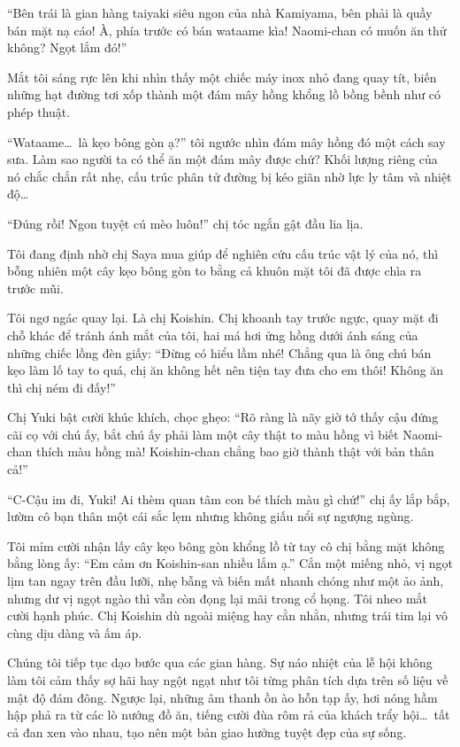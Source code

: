 \documentclass[../main.tex]{subfiles}
\begin{document}
``Bên trái là gian hàng taiyaki siêu ngon của nhà Kamiyama, bên phải là quầy bán mặt nạ cáo! À, phía trước có bán wataame kìa! Naomi-chan có muốn ăn thử không? Ngọt lắm đó!''

Mắt tôi sáng rực lên khi nhìn thấy một chiếc máy inox nhỏ đang quay tít, biến những hạt đường tơi xốp thành một đám mây hồng khổng lồ bồng bềnh như có phép thuật.

``Wataame\dots\ là kẹo bông gòn ạ?'' tôi ngước nhìn đám mây hồng đó một cách say sưa. Làm sao người ta có thể ăn một đám mây được chứ? Khối lượng riêng của nó chắc chắn rất nhẹ, cấu trúc phân tử đường bị kéo giãn nhờ lực ly tâm và nhiệt độ\dots

``Đúng rồi! Ngon tuyệt cú mèo luôn!'' chị tóc ngắn gật đầu lia lịa.

Tôi đang định nhờ chị Saya mua giúp để nghiên cứu cấu trúc vật lý của nó, thì bỗng nhiên một cây kẹo bông gòn to bằng cả khuôn mặt tôi đã được chìa ra trước mũi.

Tôi ngơ ngác quay lại. Là chị Koishin. Chị khoanh tay trước ngực, quay mặt đi chỗ khác để tránh ánh mắt của tôi, hai má hơi ửng hồng dưới ánh sáng của những chiếc lồng đèn giấy: ``Đừng có hiểu lầm nhé! Chẳng qua là ông chú bán kẹo làm lố tay to quá, chị ăn không hết nên tiện tay đưa cho em thôi! Không ăn thì chị ném đi đấy!''

Chị Yuki bật cười khúc khích, chọc ghẹo: ``Rõ ràng là nãy giờ tớ thấy cậu đứng cãi cọ với chú ấy, bắt chú ấy phải làm một cây thật to màu hồng vì biết Naomi-chan thích màu hồng mà! Koishin-chan chẳng bao giờ thành thật với bản thân cả!''

``C-Cậu im đi, Yuki! Ai thèm quan tâm con bé thích màu gì chứ!'' chị ấy lắp bắp, lườm cô bạn thân một cái sắc lẹm nhưng không giấu nổi sự ngượng ngùng.

Tôi mỉm cười nhận lấy cây kẹo bông gòn khổng lồ từ tay cô chị bằng mặt không bằng lòng ấy: ``Em cảm ơn Koishin-san nhiều lắm ạ.'' Cắn một miếng nhỏ, vị ngọt lịm tan ngay trên đầu lưỡi, nhẹ bẫng và biến mất nhanh chóng như một ảo ảnh, nhưng dư vị ngọt ngào thì vẫn còn đọng lại mãi trong cổ họng. Tôi nheo mắt cười hạnh phúc. Chị Koishin dù ngoài miệng hay cằn nhằn, nhưng trái tim lại vô cùng dịu dàng và ấm áp.

Chúng tôi tiếp tục dạo bước qua các gian hàng. Sự náo nhiệt của lễ hội không làm tôi cảm thấy sợ hãi hay ngột ngạt như tôi từng phân tích dựa trên số liệu về mật độ đám đông. Ngược lại, những âm thanh ồn ào hỗn tạp ấy, hơi nóng hầm hập phả ra từ các lò nướng đồ ăn, tiếng cười đùa rôm rả của khách trẩy hội\dots\ tất cả đan xen vào nhau, tạo nên một bản giao hưởng tuyệt đẹp của sự sống.
\end{document}
